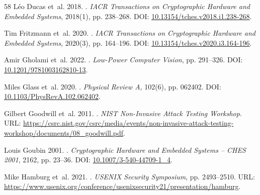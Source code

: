 \documentclass[letterpaper]{article}
\begin{document}
\begin{thebibliography}{58}
L{\'e}o Ducas et~al. 2018.
.
\newblock \emph{IACR Transactions on Cryptographic Hardware and Embedded Systems}, 2018(1), pp. 238--268.
\newblock DOI: \href{https://doi.org/10.13154/tches.v2018.i1.238-268}{10.13154/tches.v2018.i1.238-268}.

Tim Fritzmann et~al. 2020.
.
\newblock \emph{IACR Transactions on Cryptographic Hardware and Embedded Systems}, 2020(3), pp. 164--196.
\newblock DOI: \href{https://doi.org/10.13154/tches.v2020.i3.164-196}{10.13154/tches.v2020.i3.164-196}.

Amir Gholami et~al. 2022.
.
\newblock \emph{Low-Power Computer Vision}, pp. 291--326.
\newblock DOI: \href{https://doi.org/10.1201/9781003162810-13}{10.1201/9781003162810-13}.

Miles Glass et~al. 2020.
.
\newblock \emph{Physical Review A}, 102(6), pp. 062402.
\newblock DOI: \href{https://doi.org/10.1103/PhysRevA.102.062402}{10.1103/PhysRevA.102.062402}.

Gilbert Goodwill et~al. 2011.
.
\newblock \emph{NIST Non-Invasive Attack Testing Workshop}.
\newblock URL: \url{https://csrc.nist.gov/csrc/media/events/non-invasive-attack-testing-workshop/documents/08_goodwill.pdf}.

Louis Goubin 2001.
.
\newblock \emph{Cryptographic Hardware and Embedded Systems -- CHES 2001}, 2162, pp. 23--36.
\newblock DOI: \href{https://doi.org/10.1007/3-540-44709-1_4}{10.1007/3-540-44709-1_4}.

Mike Hamburg et~al. 2021.
.
\newblock \emph{USENIX Security Symposium}, pp. 2493--2510.
\newblock URL: \url{https://www.usenix.org/conference/usenixsecurity21/presentation/hamburg}.


\end{thebibliography}
\end{document}

